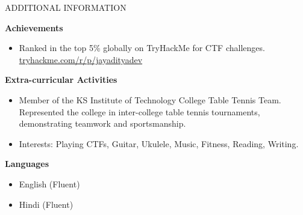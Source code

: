 \documentclass{resume} %
\begin{document}
\begin{rSection}{ADDITIONAL INFORMATION}

    \textbf{Achievements}
    \begin{itemize}
        \item Ranked in the top 5\% globally on TryHackMe for CTF challenges. \\ 
        \href{https://tryhackme.com/r/p/jayadityadev}{tryhackme.com/r/p/jayadityadev}
    \end{itemize}

    \vspace{0.2em}
    
    \textbf{Extra-curricular Activities}
    \begin{itemize}
        \item Member of the KS Institute of Technology College Table Tennis Team. \\
              Represented the college in inter-college table tennis tournaments, demonstrating teamwork and sportsmanship.
        \item Interests: Playing CTFs, Guitar, Ukulele, Music, Fitness, Reading, Writing.
    \end{itemize}

    \vspace{0.2em}
    
    \textbf{Languages}
    \begin{itemize}
        \item English (Fluent)
        \item Hindi (Fluent)
    \end{itemize}

\end{rSection}
\end{document}
